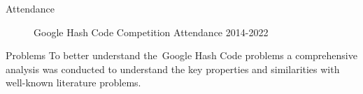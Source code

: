 \begin{frame}{Attendance}
  \begin{figure}[ht]
    
    \caption{Google Hash Code Competition Attendance 2014-2022}
    \label{fig:hashcode-attendance}
  \end{figure}
\end{frame}

\begin{frame}{Problems}
  To better understand the~\alert{Google Hash Code} problems a comprehensive
  analysis was conducted to understand the key properties and similarities with
  well-known literature problems.

  \begin{table}[ht]
\end{table}
\end{frame}
